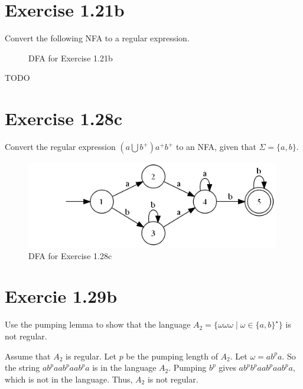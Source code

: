 \documentclass{article}
\newcommand{\union}{\bigcup}
\newcommand{\where}{\mid}
\begin{document}
\section{Exercise 1.21b}

Convert the following NFA to a regular expression.

\begin{figure}[h!]
	\centering
	\caption{DFA for Exercise 1.21b}
\end{figure}

TODO

\section{Exercise 1.28c}

Convert the regular expression $(a \union b^+) a^+ b^+$ to an NFA, given that
$\Sigma = \{a, b\}$.

\begin{figure}[h!]
	\centering
	\includegraphics[height=1.5in]{1_28.png}
	\caption{DFA for Exercise 1.28c}
\end{figure}

\section{Exercie 1.29b}

Use the pumping lemma to show that the language $A_2 = \{ \omega \omega \omega
\where \omega \in \{a, b\}^\star \}$ is not regular.

Assume that $A_2$ is regular. Let $p$ be the pumping length of $A_2$. Let
$\omega = ab^pa$. So the string $ab^paab^paab^pa$ is in the language $A_2$.
Pumping $b^p$ gives $ab^pb^paab^paab^pa$, which is not in the language. Thus,
$A_2$ is not regular.
\end{document}

